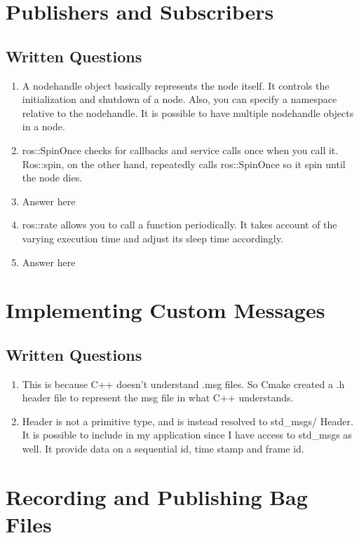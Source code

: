 \documentclass[letta4 paper]{article}
\numberwithin{equation}{section}
\newcommand{\0}{\mathbf{0}}
\begin{document}
	\section{Publishers and Subscribers}
	
	\subsection{Written Questions}
	\begin{enumerate}
		\item A nodehandle object basically represents the node itself. It controls the initialization and shutdown of a node. Also, you can specify a namespace relative to the nodehandle.
It is possible to have multiple nodehandle objects in a node.

		\item ros::SpinOnce checks for callbacks and service calls once when you call it. 
Ros::spin, on the other hand, repeatedly calls ros::SpinOnce so it spin until the node dies. 

		\item Answer here
		\item ros::rate allows you to call a function periodically. It takes account of the varying execution time and adjust its sleep time accordingly. 
		\item Answer here
	\end{enumerate}{}
			
	\section{ Implementing Custom Messages}
	
	\subsection{Written Questions}
	\begin{enumerate}
		\item This is because C++ doesn’t understand .msg files. So Cmake created a .h header file to represent the msg file in what C++ understands. 
		\item Header is not a primitive type, and is instead resolved to std_msgs/ Header. It is possible to include in my application since I have access to std_msgs as well. It provide data on a sequential id, time stamp and frame id. 
	\end{enumerate}{}

	\section{Recording and Publishing Bag Files}
\end{document}
